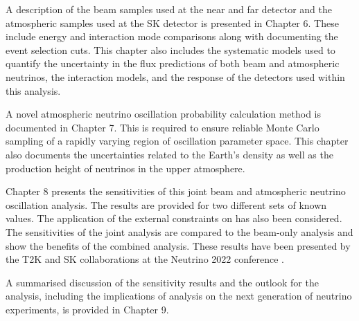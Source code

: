 A description of the beam samples used at the near and far detector and the atmospheric samples used at the SK detector is presented in Chapter 6. These include energy and interaction mode comparisons along with documenting the event selection cuts. This chapter also includes the systematic models used to quantify the uncertainty in the flux predictions of both beam and atmospheric neutrinos, the interaction models, and the response of the detectors used within this analysis.

A novel atmospheric neutrino oscillation probability calculation method is documented in Chapter 7. This is required to ensure reliable Monte Carlo sampling of a rapidly varying region of oscillation parameter space. This chapter also documents the uncertainties related to the Earth's density as well as the production height of neutrinos in the upper atmosphere.

Chapter 8 presents the sensitivities of this joint beam and atmospheric neutrino oscillation analysis.
The results are provided for two different sets of known values. The application of the external constraints on  has also been considered. The sensitivities of the joint analysis are compared to the beam-only analysis and show the benefits of the combined analysis. These results have been presented by the T2K and SK collaborations at the Neutrino 2022 conference \cite{Bronner2022-wd}.

A summarised discussion of the sensitivity results and the outlook for the analysis, including the implications of analysis on the next generation of neutrino experiments, is provided in Chapter 9.
